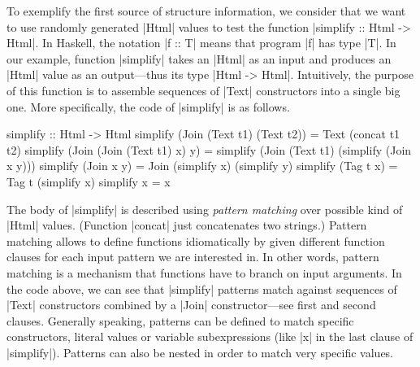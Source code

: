 To exemplify the first source of structure information, we consider that we want
to use randomly generated |Html| values to test the function |simplify :: Html
-> Html|.
%
In Haskell, the notation |f :: T| means that program |f| has type |T|.
%
In our example, function |simplify| takes an |Html| as an input and produces an
|Html| value as an output---thus its type |Html -> Html|.
%
Intuitively, the purpose of this function is to assemble sequences of |Text|
constructors into a single big one.
%
More specifically, the code of |simplify| is as follows.
%
\begin{code}
simplify :: Html -> Html
simplify (Join (Text t1) (Text t2))
  = Text (concat t1 t2)
simplify (Join (Join (Text t1) x) y)
  = simplify (Join (Text t1) (simplify (Join x y)))
simplify (Join x y) = Join (simplify x) (simplify y)
simplify (Tag t x) = Tag t (simplify x)
simplify x = x
\end{code}
%
The body of |simplify| is described using \emph{pattern matching} over possible
kind of |Html| values. (Function |concat| just concatenates two strings.)
%
Pattern matching allows to define functions idiomatically by given different
function clauses for each input pattern we are interested in.
%
In other words, pattern matching is a mechanism that functions have to branch on
input arguments.
%
In the code above, we can see that |simplify| patterns match against sequences
of |Text| constructors combined by a |Join| constructor---see first and second
clauses.
%
Generally speaking, patterns can be defined to match specific constructors,
literal values or variable subexpressions (like |x| in the last clause of
|simplify|).
%
Patterns can also be nested in order to match very specific values.




